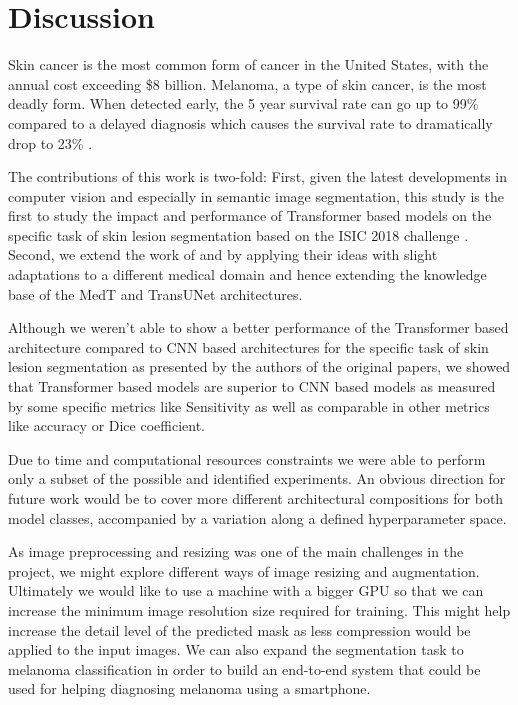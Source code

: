 \section{Discussion}

Skin cancer is the most common form of cancer in the United States, with the annual cost exceeding \$8 billion. Melanoma, a type of skin cancer, is the most deadly form. When detected early, the 5 year survival rate can go up to 99\% compared to a delayed diagnosis which causes the survival rate to dramatically drop to 23\% \citep{challenge-2018-codella}.

\par
The contributions of this work is two-fold: First, given the latest developments in computer vision and especially in semantic image segmentation, this study is the first to study the impact and performance of Transformer based models \citep{transformers-2020-dosovitskiy} on the specific task of skin lesion segmentation based on the ISIC 2018 challenge \citep{isic-2018-segmentation}. Second, we extend the work of \citep{medical_transformer-2021-valanarasu} and \citep{transunet-2021-chen} by applying their ideas with slight adaptations to a different medical domain and hence extending the knowledge base of the MedT and TransUNet architectures.

\par
Although we weren’t able to show a better performance of the Transformer based architecture compared to CNN based architectures for the specific task of skin lesion segmentation as presented by the authors of the original papers, we showed that Transformer based models are superior to CNN based models as measured by some specific metrics like Sensitivity as well as comparable in other metrics like accuracy or Dice coefficient.

\par
Due to time and computational resources constraints we were able to perform only a subset of the possible and identified experiments. An obvious direction for future work would be to cover more different architectural compositions for both model classes, accompanied by a variation along a defined  hyperparameter space.

\par
As image preprocessing and resizing was one of the main challenges in the project, we might explore different ways of image resizing and augmentation. Ultimately we would like to use a machine with a bigger GPU so that we can increase the minimum image resolution size required for training. This might help increase the detail level of the predicted mask as less compression would be applied to the input images. We can also expand the segmentation task to melanoma classification in order to build an end-to-end system that could be used for helping diagnosing melanoma using a smartphone.


